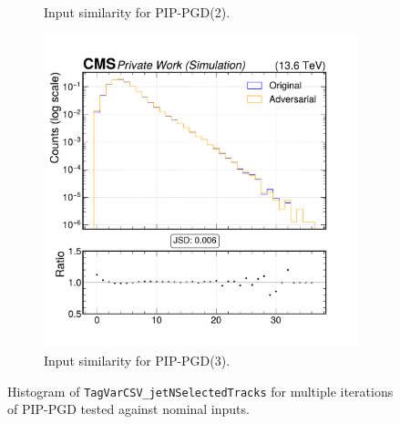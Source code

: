\begin{figure}[htbp]
\begin{subfigure}[t]{0.32\textwidth}
    \caption*{Input similarity for PIP-PGD(2).}
  \end{subfigure}\hfill
  \begin{subfigure}[t]{0.32\textwidth}
    \includegraphics[width=\linewidth]{media/output/features/compare/combined_it_3/cmp_global_features_TagVarCSV_jetNSelectedTracks.pdf}
    \caption*{Input similarity for PIP-PGD(3).}
  \end{subfigure}

  \caption*{Histogram of \texttt{TagVarCSV\_jetNSelectedTracks} for multiple iterations of PIP-PGD tested against nominal inputs.}
  \label{fig:combined_input_TagVarCSV_jetNSelectedTracks}
\end{figure}

